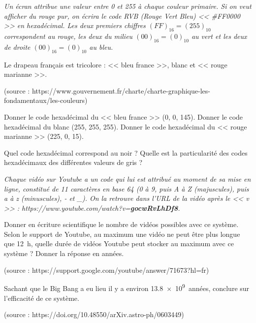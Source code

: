 \documentclass["../Cours.tex"]{subfiles}
\begin{document}
{\begin{questions}
    \textit{Un écran attribue une valeur entre 0 et 255 à chaque couleur primaire. Si on veut afficher du rouge pur, on écrira le code RVB (Rouge Vert Bleu) << \#FF0000 >> en hexadécimal. Les deux premiers chiffres $(FF)_{16} = (255)_{10}$ correspondent au rouge, les deux du milieu $(00)_{16}=(0)_{10}$ au vert et les deux de droite $(00)_{16}=(0)_{10}$ au bleu. }

    \question Le drapeau français est tricolore : << bleu france >>, blanc et << rouge marianne >>. 
    \begin{flushright}\vspace{-1ex}
        (source : \scriptsize{https://www.gouvernement.fr/charte/charte-graphique-les-fondamentaux/les-couleurs})
    \end{flushright}\vspace{-1ex}
    \subquestion Donner le code hexadécimal du << bleu france >> (0, 0, 145).
    \subquestion Donner le code hexadécimal du blanc (255, 255, 255).
    \subquestion Donner le code hexadécimal du << rouge marianne >> (225, 0, 15).

    \question Quel code hexadécimal correspond au noir ?
    \question Quelle est la particularité des codes hexadécimaux des différentes valeurs de gris ?

    \textit{Chaque vidéo sur Youtube a un code qui lui est attribué au moment de sa mise en ligne, constitué de 11 caractères en base 64 (0 à 9, puis A à Z (majuscules), puis a à z (minuscules), - et \_). On la retrouve dans l'URL de la vidéo après le << v >> : https://www.youtube.com/watch?v=\textbf{gocwRvLhDf8}.}

    \question Donner en écriture scientifique le nombre de vidéos possibles avec ce système.
    \question Selon le support de Youtube, au maximum une vidéo ne peut être plus longue que \qty{12}{\hour}, quelle durée de vidéos Youtube peut stocker au maximum avec ce système ? Donner la réponse en années.
    \begin{flushright}\vspace{-1ex}
        (source : \scriptsize{https://support.google.com/youtube/answer/71673?hl=fr})
    \end{flushright}\vspace{-1ex}
    \question Sachant que le Big Bang a eu lieu il y a environ \qty{13.8e9}{années}, conclure sur l'efficacité de ce système.
        \begin{flushright}\vspace{-1ex}
        (source : \scriptsize{https://doi.org/10.48550/arXiv.astro-ph/0603449})
    \end{flushright}\vspace{-1ex}

\end{questions}
}
\end{document}
